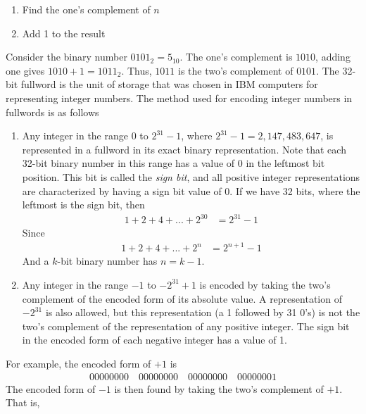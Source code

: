 \documentclass{report}
\begin{document}
\begin{itemize}
\begin{enumerate}
                \item Find the one's complement of $n$
                \item Add 1 to the result
            \end{enumerate}
            Consider the binary number $0101_{2} = 5_{10}$. The one's complement is $1010$, adding one gives $1010 + 1 = 1011_{2}$. Thus, $1011$ is the two's complement of $0101$.
            \bigbreak \noindent 
            The 32-bit fullword is the unit of storage that was chosen in IBM computers for representing integer numbers. The method used for encoding integer numbers in fullwords is as follows
            \begin{enumerate}
                \item Any integer in the range $0$ to $2^{31} - 1$, where $2^{31}-1 = 2,147,483,647$, is represented in a fullword in its exact binary representation. Note that each 32-bit binary number in this range has a value of 0 in the leftmost bit position. This bit is called the \textit{sign bit}, and all positive integer representations are characterized by having a sign bit value of 0.  
                    \bigbreak \noindent 
                    If we have 32 bits, where the leftmost is the sign bit, then
                    \begin{align*}
                        1 + 2 + 4  + ... + 2^{30} &= 2^{31} -1
                    \end{align*}
                    Since 
                    \begin{align*}
                        1 + 2 + 4 + ... + 2^{n} &= 2^{n+1}-1
                    \end{align*}
                    And a $k$-bit binary number has $n = k-1$.
                \item Any integer in the range $-1$ to $-2^{31} + 1$ is encoded by taking the two's complement of the encoded form of its absolute value. A representation of $-2^{31}$ is also allowed, but this representation (a 1 followed by 31 0's) is not the two's complement of the representation of any positive integer. The sign bit in the encoded form of each negative integer has a value of 1.
            \end{enumerate}
            For example, the encoded form of $+1$ is 
            \begin{align*}
                00000000 \quad 00000000 \quad 00000000 \quad 00000001
            \end{align*}
            The encoded form of $-1$ is then found by taking the two's complement of $+1$. That is,

\end{itemize}
\end{document}
